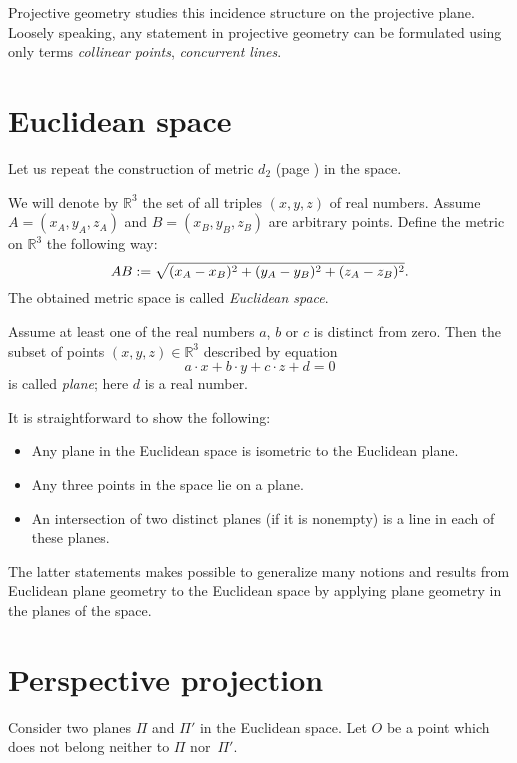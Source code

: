 Projective geometry studies this incidence structure on the projective plane.
Loosely speaking, any statement in projective geometry can be formulated using only terms {}\emph{collinear points},
\emph{concurrent lines}.



\section*{Euclidean space}

Let us repeat the construction of metric $d_2$ (page 
\pageref{def:d_2}) in the space.

We will denote by $\mathbb{R}^3$ the set of all triples $(x,y,z)$ of real numbers.
Assume $A=(x_A,y_A,z_A)$ and $B=(x_B,y_B,z_B)$ are arbitrary points.
Define the metric on $\mathbb{R}^3$ the following way:
$$AB
:=
\sqrt{(x_A-x_B)^2+(y_A-y_B)^2+(z_A-z_B)^2}.$$
The obtained metric space is called \emph{Euclidean space}.

Assume at least one of the real numbers $a$, $b$ or $c$ is distinct from zero.
Then the subset of points $(x,y,z)\in\mathbb{R}^3$ 
described by equation
$$a\cdot x+b\cdot y+c\cdot z+d=0$$ 
is called \emph{plane};
here $d$ is a real number.

It is straightforward to show the following:
\begin{itemize}
 \item Any plane in the Euclidean space is isometric to the Euclidean plane.
 \item Any three points in the space lie on a plane.
 \item An intersection of two distinct planes (if it is nonempty) is a line in each of these planes.
\end{itemize}

The latter statements makes possible to generalize many notions and results from Euclidean plane geometry to the Euclidean space
by applying plane geometry in the planes of the space.

\section*{Perspective projection}

Consider two planes $\Pi$ and $\Pi'$ 
in the Euclidean space. 
Let $O$ be a point which does not belong neither to $\Pi$ nor~$\Pi'$.

